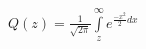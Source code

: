 \documentclass[20pt]{report}
\begin{document}
\begin{center}
\(
Q(z)=\frac{1}{\sqrt{2\pi }}\int\limits_{z}^{\infty }e^{\frac{-x^{2}}{2}d x}
\)
\end{center}
\end{document}
